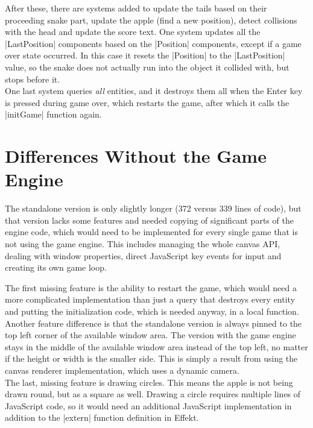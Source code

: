 After these, there are systems added to update the tails based on their proceeding snake part, update the apple (find a new position), detect collisions with the head and update the score text. One system updates all the |LastPosition| components based on the |Position| components, except if a game over state occurred. In this case it resets the |Position| to the |LastPosition| value, so the snake does not actually run into the object it collided with, but stops before it.\\
One last system queries \textit{all} entities, and it destroys them all when the Enter key is pressed during game over, which restarts the game, after which it calls the |initGame| function again.

\section{Differences Without the Game Engine}

The standalone version is only slightly longer (372 versus 339 lines of code), but that version lacks some features and needed copying of significant parts of the engine code, which would need to be implemented for every single game that is not using the game engine. This includes managing the whole canvas API, dealing with window properties, direct JavaScript key events for input and creating its own game loop.

The first missing feature is the ability to restart the game, which would need a more complicated implementation than just a query that destroys every entity and putting the initialization code, which is needed anyway, in a local function.\\
Another feature difference is that the standalone version is always pinned to the top left corner of the available window area. The version with the game engine stays in the middle of the available window area instead of the top left, no matter if the height or width is the smaller side. This is simply a result from using the canvas renderer implementation, which uses a dynamic camera.\\
The last, missing feature is drawing circles. This means the apple is not being drawn round, but as a square as well. Drawing a circle requires multiple lines of JavaScript code, so it would need an additional JavaScript implementation in addition to the |extern| function definition in Effekt.

